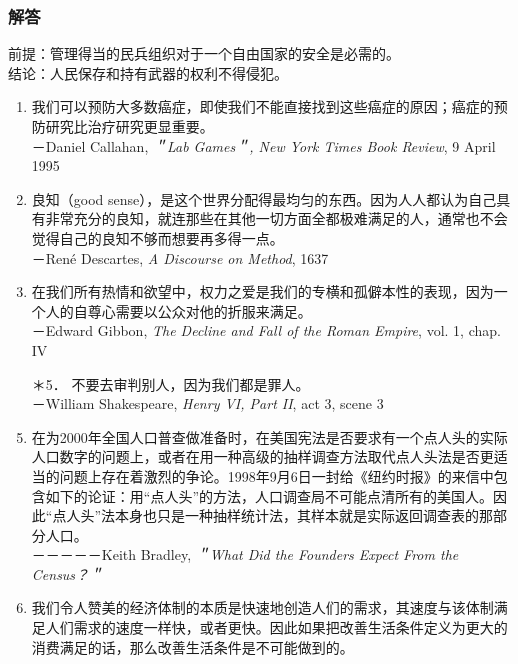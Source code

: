 \subsubsection*{解答}
前提：管理得当的民兵组织对于一个自由国家的安全是必需的。\\
结论：人民保存和持有武器的权利不得侵犯。

\begin{enumerate}[label=\arabic*., itemsep=1ex, topsep=1ex, start=2]
\item 我们可以预防大多数癌症，即使我们不能直接找到这些癌症的原因；癌症的预防研究比治疗研究更显重要。\\
    \null\hspace{\parindent}－Daniel Callahan, \textit{＂Lab Games＂, New York Times Book Review}, 9 April 1995
\item 良知（good sense），是这个世界分配得最均匀的东西。因为人人都认为自己具有非常充分的良知，就连那些在其他一切方面全都极难满足的人，通常也不会觉得自己的良知不够而想要再多得一点。\\
    \null\hspace{\parindent}－René Descartes, \textit{A Discourse on Method}, 1637
\item 在我们所有热情和欲望中，权力之爱是我们的专横和孤僻本性的表现，因为一个人的自尊心需要以公众对他的折服来满足。\\
    \null\hspace{\parindent}－Edward Gibbon, \textit{The Decline and Fall of the Roman Empire}, vol. 1, chap. IV
\item[＊5．] 不要去审判别人，因为我们都是罪人。\\ %
    \null\hspace{\parindent}－William Shakespeare, \textit{Henry VI, Part II}, act 3, scene 3
\item 在为2000年全国人口普查做准备时，在美国宪法是否要求有一个点人头的实际人口数字的问题上，或者在用一种高级的抽样调查方法取代点人头法是否更适当的问题上存在着激烈的争论。1998年9月6日一封给《纽约时报》的来信中包含如下的论证：用“点人头”的方法，人口调查局不可能点清所有的美国人。因此“点人头”法本身也只是一种抽样统计法，其样本就是实际返回调查表的那部分人口。\\
    \null\hspace{\parindent}－－－－－Keith Bradley, \textit{＂What Did the Founders Expect From the Census？＂}
\item 我们令人赞美的经济体制的本质是快速地创造人们的需求，其速度与该体制满足人们需求的速度一样快，或者更快。因此如果把改善生活条件定义为更大的消费满足的话，那么改善生活条件是不可能做到的。\\

\end{enumerate}
